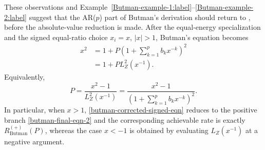 \documentclass[12pt]{article}
\begin{document}



These observations and Example~\ref{Butman-example-1:label}--\ref{Butman-example-2:label} suggest that the AR($p$) part of Butman's derivation should return to \cite[Equation (39)]{butman1976linear}, before the absolute-value reduction is made. After the equal-energy specialization and the signed equal-ratio choice $x_i=x$, $|x|>1$, Butman's equation \cite[Equation (39)]{butman1976linear} becomes
\begin{align}
    x^2  &= 1+P\left(1+\sum_{k=1}^{p}b_k x^{-k}\right)^2 \nonumber\\
    &= 1+P L_Z^2(x^{-1}). \label{butman-corrected-signed-eqn}
\end{align}
Equivalently,
\begin{equation}\label{butman-corrected-power}
    P
    =
    \frac{x^2-1}{L_Z^2(x^{-1})}
    =
    \frac{x^2-1}
    {\left(1+\sum_{k=1}^{p}b_kx^{-k}\right)^2}.
\end{equation}
In particular, when \(x>1\), \eqref{butman-corrected-signed-eqn} reduces to the positive branch \eqref{butman-final-eqn-2} and the corresponding achievable rate is exactly $R^{(+)}_{\mathrm{Butman}}(P)$, whereas the case \(x<-1\) is obtained by evaluating \(L_Z(x^{-1})\) at a negative argument.
\end{document}
